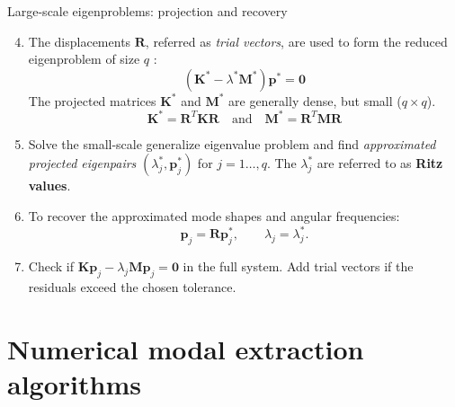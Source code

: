 \documentclass[aspectratio=169]{beamer}
\begin{document}
\begin{frame}{Large-scale eigenproblems: projection and recovery}
  \vspace{-0.2cm}
  \small
  \begin{enumerate}
    \setcounter{enumi}{3}
    \item   The displacements $\mathbf R$, referred as \emph{trial vectors}, are used to form the reduced eigenproblem of size $q$ :
          $$(\mathbf K^* - \lambda^* \mathbf{M}^*)\mathbf p^*=\mathbf 0$$
          The projected matrices $\mathbf K^*$ and $\mathbf M^*$ are generally dense, but small ($q\times q$).
          $$\mathbf K^*=\mathbf R^T\mathbf K\mathbf R\quad \mbox{and}\quad \mathbf M^*=\mathbf R^T\mathbf M\mathbf R$$
  \end{enumerate}
  \vspace{-0.2cm}
  \begin{block}{}
    \begin{enumerate}
      \setcounter{enumi}{4}
      \item Solve the small-scale generalize eigenvalue problem and find \emph{approximated projected eigenpairs} $(\lambda_j^*,\mathbf p_j^*)$ for $j=1\dots,q$. The $\lambda_j^*$ are referred to as \textbf{Ritz values}.
    \end{enumerate}
  \end{block}
  \begin{enumerate}
    \setcounter{enumi}{5} \item To recover the approximated mode shapes and angular frequencies:
          \[
            {\mathbf p}_j=\mathbf R\mathbf p_j^*,\qquad
            \lambda_j=\lambda_j^*.
          \]
    \item   Check if $\mathbf K{\mathbf p}_j-\lambda_j\mathbf M{\mathbf p}_j=\mathbf 0$ in the full system. Add trial vectors if the residuals exceed the chosen tolerance.
  \end{enumerate}
\end{frame}

\section[Numerical modal extraction algorithms for small-scale problems]{Numerical modal extraction algorithms}
\end{document}
